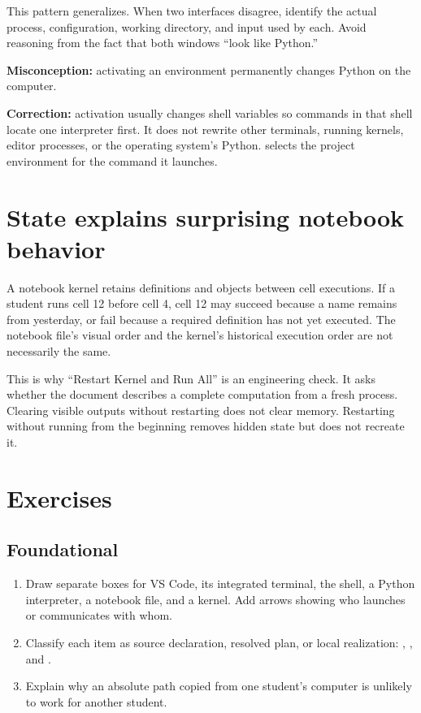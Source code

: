 This pattern generalizes. When two interfaces disagree, identify the actual
process, configuration, working directory, and input used by each. Avoid
reasoning from the fact that both windows ``look like Python.''

\begin{misconceptionbox}
\textbf{Misconception:} activating an environment permanently changes Python on
the computer.

\textbf{Correction:} activation usually changes shell variables so commands in
that shell locate one interpreter first. It does not rewrite other terminals,
running kernels, editor processes, or the operating system's Python.  selects the project environment for the command it launches.
\end{misconceptionbox}

\section{State explains surprising notebook behavior}

A notebook kernel retains definitions and objects between cell executions. If a
student runs cell 12 before cell 4, cell 12 may succeed because a name remains
from yesterday, or fail because a required definition has not yet executed.
The notebook file's visual order and the kernel's historical execution order
are not necessarily the same.

This is why ``Restart Kernel and Run All'' is an engineering check. It asks
whether the document describes a complete computation from a fresh process.
Clearing visible outputs without restarting does not clear memory. Restarting
without running from the beginning removes hidden state but does not recreate
it.


\section{Exercises}

\subsection*{Foundational}

\begin{enumerate}
  \item Draw separate boxes for VS Code, its integrated terminal, the shell, a
  Python interpreter, a notebook file, and a kernel. Add arrows showing who
  launches or communicates with whom.
  \item Classify each item as source declaration, resolved plan, or local
  realization: , , and .
  \item Explain why an absolute path copied from one student's computer is
  unlikely to work for another student.
\end{enumerate}

